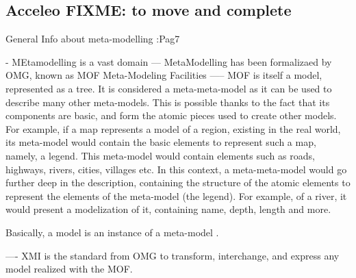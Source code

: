 \subsection{Acceleo FIXME: to move and complete}
\label{acceleo}

General Info about meta-modelling   :Pag7 \cite{AcceleoUserGuide}

- MEtamodelling is a vast domain
--- MetaModelling has been formalizaed by OMG, known as MOF Meta-Modeling Facilities
----- MOF is itself a model, represented as a tree. It is considered a meta-meta-model as it can be used to describe many other meta-models. This is possible thanks to the fact that its components are basic, and form the atomic pieces used to create other models. 
For example, if a map represents a model of a region, existing in the real world, its meta-model would contain the basic elements to represent such a map, namely, a legend. This meta-model would contain elements such as roads, highways, rivers, cities, villages etc. In this context, a meta-meta-model would go further deep in the description, containing the structure of the atomic elements to represent the elements of the meta-model (the legend). For example, of a river, it would present a modelization of it, containing name, depth, length and more.  

Basically, a model is an instance of a meta-model \cite{UnderstandMetamodelling}. 


---- XMI is the standard from OMG to transform, interchange, and express any model realized with the MOF.   